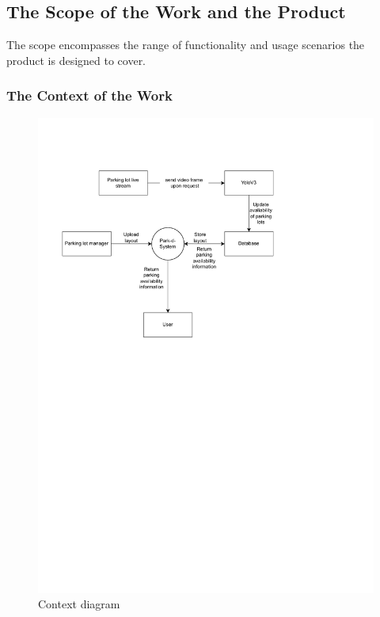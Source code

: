 \documentclass[12pt,letterpaper]{article}
\begin{document}
\subsection{The Scope of the Work and the Product}
The scope encompasses the range of functionality and usage scenarios the product
is designed to cover. \subsubsection{\color{red} The Context of the Work}


\begin{figure}[ht]
    \begin{center}
        \caption{Context diagram}
        \includegraphics[scale=1.0]{Context_diagram.pdf}
    \end{center}
\end{figure}
\end{document}
